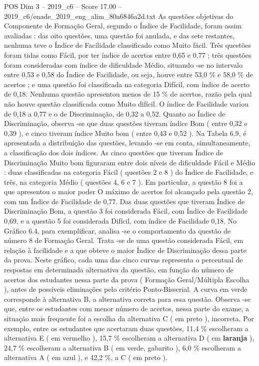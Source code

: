 \begin{textsample}{POS Dim 3 – 2019\_c6 – Score 17.00 – 2019\_c6/enade\_2019\_eng\_alim\_80a6846a2d.txt}
As questões objetivas do Componente de Formação Geral, segundo o Índice de Facilidade, foram assim avaliadas : das oito questões, uma questão foi anulada, e das sete restantes, nenhuma teve o Índice de Facilidade classificado como Muito fácil.
Três questões foram tidas como Fácil, por ter índice de acertos entre 0,65 e 0,77 ; três questões foram consideradas com índice de dificuldade Médio, situando -se no intervalo entre 0,53 e 0,58 do Índice de Facilidade, ou seja, houve entre 53,0 \% e 58,0 \% de acertos ; e uma questão foi classificada na categoria Difícil, com índice de acerto de 0,18.
Nenhuma questão apresentou menos de 15 \% de acertos, razão pela qual não houve questão classificada como Muito difícil.
O índice de Facilidade variou de 0,18 a 0,77 e o de Discriminação, de 0,32 a 0,52.
Quanto ao Índice de Discriminação, observa -se que duas questões tiveram índice Bom ( entre 0,32 e 0,39 ), e cinco tiveram índice Muito bom ( entre 0,43 e 0,52 ).
Na Tabela 6.9, é apresentada a distribuição das questões, levando -se em conta, simultaneamente, a classificação dos dois índices.
As cinco questões que tiveram Índice de Discriminação Muito bom figuraram entre dois níveis de dificuldade Fácil e Médio : duas classificadas na categoria Fácil ( questões 2 e 8 ) do Índice de Facilidade, e três, na categoria Médio ( questões 4, 6 e 7 ).
Em particular, a questão 8 foi a que apresentou o maior poder O máximo de acertos foi alcançado pela questão 2, com um Índice de Facilidade de 0,77.
Das duas questões que tiveram Índice de Discriminação Bom, a questão 3 foi considerada Fácil, com Índice de Facilidade 0,69, e a questão 5 foi considerada Difícil, com índice de Facilidade 0,18.
No Gráfico 6.4, para exemplificar, analisa -se o comportamento da questão de número 8 de Formação Geral.
Trata -se de uma questão considerada Fácil, em relação à facilidade e a que obteve o maior Índice de Discriminação dessa parte da prova.
Neste gráfico, cada uma das cinco curvas representa o percentual de respostas em determinada alternativa da questão, em função do número de acertos dos estudantes nessa parte da prova ( Formação Geral/Múltipla Escolha ), antes de possíveis eliminações pelo critério Ponto-Bisserial.
A curva em verde corresponde à alternativa B, a alternativa correta para essa questão.
Observa -se que, entre os estudantes com menor número de acertos, nessa parte do exame, a situação mais frequente foi a escolha da alternativa C ( em preto ), incorreta.
Por exemplo, entre os estudantes que acertaram duas questões, 11,4 \% escolheram a alternativa E ( em vermelho ), 15,7 \% escolheram a alternativa D ( em \textbf{laranja} ), 24,7 \% escolheram a alternativa B ( em verde, gabarito ), 6,0 \% escolheram a alternativa A ( em azul ), e 42,2 \%, a C ( em preto ).

\end{textsample}
